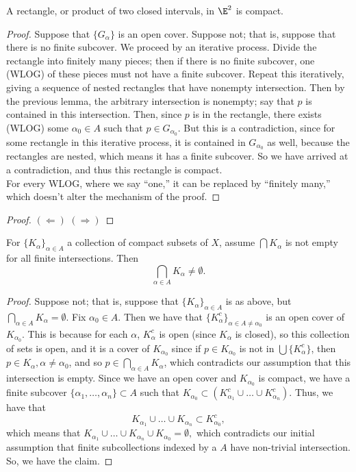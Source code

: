 \documentclass{notes}
\begin{document}
\begin{proposition}
  A rectangle, or product of two closed intervals, in $\E^2$ is compact.
\end{proposition}
\begin{proof}
  Suppose that $\{G_\alpha\}$ is an open cover. Suppose not; that is, suppose that there is no finite
  subcover. We proceed by an iterative process. Divide the rectangle into finitely many pieces; then
  if there is no finite subcover, one (WLOG) of these pieces must not have a finite subcover. Repeat
  this iteratively, giving a sequence of nested rectangles that have nonempty intersection. Then by the 
  previous lemma, the arbitrary intersection is nonempty; say that $p$ is contained in this intersection.
  Then, since $p$ is in the rectangle, there exists (WLOG) some $\alpha_0\in A$ such that $p\in G_{\alpha_0}$.
  But this is a contradiction, since for some rectangle in this iterative process, it is contained 
  in $G_{\alpha_0}$ as well, because the rectangles are nested, which means it has a finite subcover.
  So we have arrived at a contradiction, and thus this rectangle is compact. \\

  For every WLOG, where we say ``one,'' it can be replaced by ``finitely many,'' which doesn't alter
  the mechanism of the proof.
\end{proof}


\begin{proof}%
  $(\Leftarrow)$
  $(\Rightarrow)$  
\end{proof}


\begin{theorem}
  For $\{K_\alpha\}_{\alpha\in A}$ a collection of compact subsets of $X$, assume $\bigcap K_\alpha$
  is not empty for all finite intersections. Then $$\bigcap_{\alpha\in A} K_\alpha \neq\emptyset.$$
\end{theorem}
\begin{proof}
  Suppose not; that is, suppose that $\{K_\alpha\}_{\alpha\in A}$ is as above, but 
  $\bigcap_{\alpha\in A} K_\alpha = \emptyset.$ Fix $\alpha_0\in A$. Then we have that $\{K_\alpha^c\}
  _{\alpha\in A \neq \alpha_0}$ is an open cover of $K_{\alpha_0}$. This is because for each $\alpha$,
  $K_\alpha^c$ is open (since $K_\alpha$ is closed), so this collection of sets is open, and it is a cover
  of $K_{\alpha_0}$ since if $p\in K_{\alpha_0}$ is not in $\bigcup\{K_\alpha^c\}$, then $p\in K_\alpha,
  \alpha\neq{\alpha_0}$, and so $p\in\bigcap_{\alpha\in A}K_\alpha$, which contradicts our assumption 
  that this intersection is empty. Since we have an open cover and $K_{\alpha_0}$ is compact, we have a 
  finite subcover $\{\alpha_1, \ldots, \alpha_n\}\subset A$ such that $K_{\alpha_0} \subset 
  \left(K^c_{\alpha_1} \cup \ldots \cup K^c_{\alpha_n}\right)$. Thus, we have that $$K_{\alpha_1}
  \cup \ldots \cup K_{\alpha_n} \subset K^c_{\alpha_0},$$ which means that $K_{\alpha_1} \cup \ldots
  \cup K_{\alpha_n} \cup K_{\alpha_0} = \emptyset,$ which contradicts our initial assumption that
  finite subcollections indexed by a $A$ have non-trivial intersection. So, we have the claim.
\end{proof}
\end{document}
